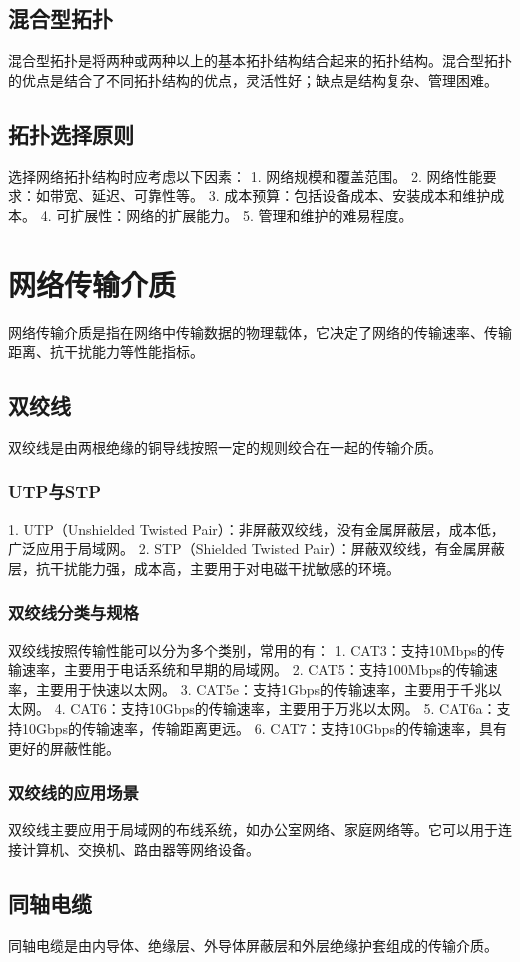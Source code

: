 \documentclass{book}
\begin{document}
\subsection{混合型拓扑}
混合型拓扑是将两种或两种以上的基本拓扑结构结合起来的拓扑结构。混合型拓扑的优点是结合了不同拓扑结构的优点，灵活性好；缺点是结构复杂、管理困难。
\subsection{拓扑选择原则}
选择网络拓扑结构时应考虑以下因素：
1. 网络规模和覆盖范围。
2. 网络性能要求：如带宽、延迟、可靠性等。
3. 成本预算：包括设备成本、安装成本和维护成本。
4. 可扩展性：网络的扩展能力。
5. 管理和维护的难易程度。
\section{网络传输介质}
网络传输介质是指在网络中传输数据的物理载体，它决定了网络的传输速率、传输距离、抗干扰能力等性能指标。
\subsection{双绞线}
双绞线是由两根绝缘的铜导线按照一定的规则绞合在一起的传输介质。
\subsubsection{UTP与STP}
1. UTP（Unshielded Twisted Pair）：非屏蔽双绞线，没有金属屏蔽层，成本低，广泛应用于局域网。
2. STP（Shielded Twisted Pair）：屏蔽双绞线，有金属屏蔽层，抗干扰能力强，成本高，主要用于对电磁干扰敏感的环境。
\subsubsection{双绞线分类与规格}
双绞线按照传输性能可以分为多个类别，常用的有：
1. CAT3：支持10Mbps的传输速率，主要用于电话系统和早期的局域网。
2. CAT5：支持100Mbps的传输速率，主要用于快速以太网。
3. CAT5e：支持1Gbps的传输速率，主要用于千兆以太网。
4. CAT6：支持10Gbps的传输速率，主要用于万兆以太网。
5. CAT6a：支持10Gbps的传输速率，传输距离更远。
6. CAT7：支持10Gbps的传输速率，具有更好的屏蔽性能。
\subsubsection{双绞线的应用场景}
双绞线主要应用于局域网的布线系统，如办公室网络、家庭网络等。它可以用于连接计算机、交换机、路由器等网络设备。
\subsection{同轴电缆}
同轴电缆是由内导体、绝缘层、外导体屏蔽层和外层绝缘护套组成的传输介质。
\end{document}

